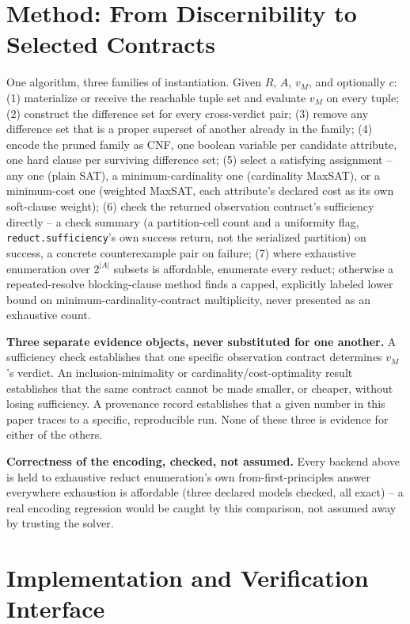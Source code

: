 \documentclass[11pt,a4paper]{article}
\theoremstyle{definition}
\begin{document}
\section{Method: From Discernibility to Selected Contracts}
\label{sec:method}

One algorithm, three families of instantiation. Given $R$, $A$, $v_M$, and optionally $c$: (1) materialize or receive the reachable tuple set and evaluate $v_M$ on every tuple; (2) construct the difference set for every cross-verdict pair; (3) remove any difference set that is a proper superset of another already in the family; (4) encode the pruned family as CNF, one boolean variable per candidate attribute, one hard clause per surviving difference set; (5) select a satisfying assignment -- any one (plain SAT), a minimum-cardinality one (cardinality MaxSAT), or a minimum-cost one (weighted MaxSAT, each attribute's declared cost as its own soft-clause weight); (6) check the returned observation contract's sufficiency directly -- a check summary (a partition-cell count and a uniformity flag, \texttt{reduct.sufficiency}'s own success return, not the serialized partition) on success, a concrete counterexample pair on failure; (7) where exhaustive enumeration over $2^{|A|}$ subsets is affordable, enumerate every reduct; otherwise a repeated-resolve blocking-clause method finds a capped, explicitly labeled lower bound on minimum-cardinality-contract multiplicity, never presented as an exhaustive count.

\noindent\textbf{Three separate evidence objects, never substituted for one another.} A sufficiency check establishes that one specific observation contract determines $v_M$'s verdict. An inclusion-minimality or cardinality/cost-optimality result establishes that the same contract cannot be made smaller, or cheaper, without losing sufficiency. A provenance record establishes that a given number in this paper traces to a specific, reproducible run. None of these three is evidence for either of the others.

\noindent\textbf{Correctness of the encoding, checked, not assumed.} Every backend above is held to exhaustive reduct enumeration's own from-first-principles answer everywhere exhaustion is affordable (three declared models checked, all exact) -- a real encoding regression would be caught by this comparison, not assumed away by trusting the solver.

\section{Implementation and Verification Interface}
\label{sec:implementation}
\end{document}
